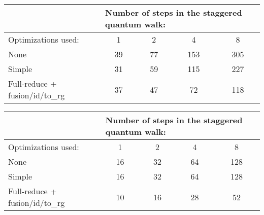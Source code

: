 \begin{table}[H]
\centering
\begin{tabular}{|l|cccc|}
\hline
                               & \multicolumn{4}{l|}{Number of steps in the staggered quantum walk:}                                   \\ \hline
Optimizations used:          & \multicolumn{1}{c|}{1}  & \multicolumn{1}{c|}{2}  & \multicolumn{1}{c|}{4}   & 8   \\ \hline
None            & \multicolumn{1}{c|}{39} & \multicolumn{1}{c|}{77} & \multicolumn{1}{c|}{153} & 305 \\ \hline
Simple     & \multicolumn{1}{c|}{31} & \multicolumn{1}{c|}{59} & \multicolumn{1}{c|}{115} & 227 \\ \hline
Full-reduce + fusion/id/to\_rg & \multicolumn{1}{c|}{37} & \multicolumn{1}{c|}{47} & \multicolumn{1}{c|}{72}  & 118 \\ \hline
\end{tabular}
\end{table}
\vspace{-1cm}
\begin{table}[H]
\centering
\begin{tabular}{|l|cccc|}
\hline
                               & \multicolumn{4}{l|}{Number of steps in the staggered quantum walk:}                                  \\ \hline
Optimizations used:          & \multicolumn{1}{c|}{1}  & \multicolumn{1}{c|}{2}  & \multicolumn{1}{c|}{4}  & 8   \\ \hline
None            & \multicolumn{1}{c|}{16} & \multicolumn{1}{c|}{32} & \multicolumn{1}{c|}{64} & 128 \\ \hline
Simple       & \multicolumn{1}{c|}{16} & \multicolumn{1}{c|}{32} & \multicolumn{1}{c|}{64} & 128 \\ \hline
Full-reduce + fusion/id/to\_rg & \multicolumn{1}{c|}{10} & \multicolumn{1}{c|}{16} & \multicolumn{1}{c|}{28} & 52  \\ \hline
\end{tabular}
\end{table}











